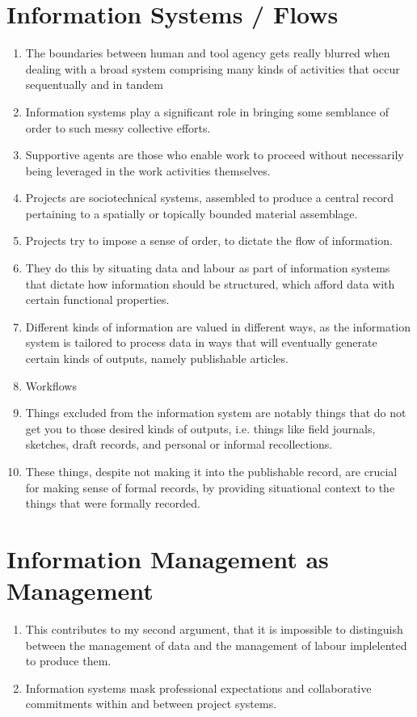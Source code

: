 \documentclass{article}
\begin{document}
\section{Information Systems / Flows}
\begin{enumerate}
  \item The boundaries between human and tool agency gets really blurred when dealing with a broad system comprising many kinds of activities that occur sequentually and in tandem

  \item Information systems play a significant role in bringing some semblance of order to such messy collective efforts.
  \item Supportive agents are those who enable work to proceed without necessarily being leveraged in the work activities themselves.

  \item Projects are sociotechnical systems, assembled to produce a central record pertaining to a spatially or topically bounded material assemblage.
  \item Projects try to impose a sense of order, to dictate the flow of information.
  \item They do this by situating data and labour as part of information systems that dictate how information should be structured, which afford data with certain functional properties.
  \item Different kinds of information are valued in different ways, as the information system is tailored to process data in ways that will eventually generate certain kinds of outputs, namely publishable articles.
  \item Workflows
  \item Things excluded from the information system are notably things that do not get you to those desired kinds of outputs, i.e. things like field journals, sketches, draft records, and personal or informal recollections.
  \item These things, despite not making it into the publishable record, are crucial for making sense of formal records, by providing situational context to the things that were formally recorded.
\end{enumerate}

\section{Information Management as Management}
\begin{enumerate}
  \item This contributes to my second argument, that it is impossible to distinguish between the management of data and the management of labour implelented to produce them.
  \item Information systems mask professional expectations and collaborative commitments within and between project systems.
\end{enumerate}
\end{document}
